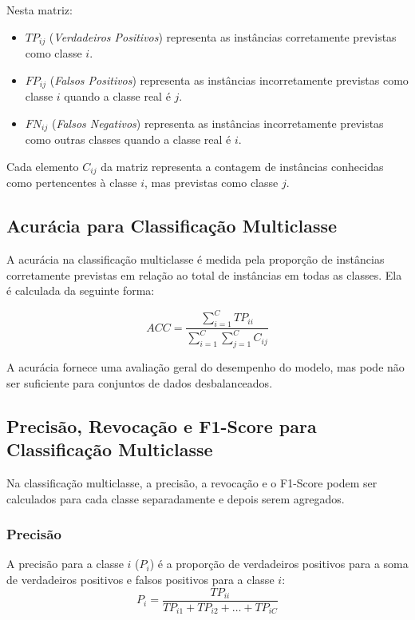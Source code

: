 Nesta matriz:
\begin{itemize}
    \item \(TP_{ij}\) (\textit{Verdadeiros Positivos}) representa as instâncias corretamente previstas como classe \(i\).
    \item \(FP_{ij}\) (\textit{Falsos Positivos}) representa as instâncias incorretamente previstas como classe \(i\) quando a classe real é \(j\).
    \item \(FN_{ij}\) (\textit{Falsos Negativos}) representa as instâncias incorretamente previstas como outras classes quando a classe real é \(i\).
\end{itemize}

Cada elemento \(C_{ij}\) da matriz representa a contagem de instâncias conhecidas como pertencentes à classe \(i\), mas previstas como classe \(j\).

\subsection{Acurácia para Classificação Multiclasse}

A acurácia na classificação multiclasse é medida pela proporção de instâncias corretamente previstas em relação ao total de instâncias em todas as classes. Ela é calculada da seguinte forma:

\[
ACC = \frac{\sum_{i=1}^{C} TP_{ii}}{\sum_{i=1}^{C} \sum_{j=1}^{C} C_{ij}}
\]

A acurácia fornece uma avaliação geral do desempenho do modelo, mas pode não ser suficiente para conjuntos de dados desbalanceados.



\subsection{Precisão, Revocação e F1-Score para Classificação Multiclasse}

Na classificação multiclasse, a precisão, a revocação e o F1-Score podem ser calculados para cada classe separadamente e depois serem agregados.

\subsubsection{Precisão}

A precisão para a classe \(i\) (\(P_i\)) é a proporção de verdadeiros positivos para a soma de verdadeiros positivos e falsos positivos para a classe \(i\):
\[ P_i = \frac{TP_{ii}}{TP_{i1} + TP_{i2} + \ldots + TP_{iC}} \]

